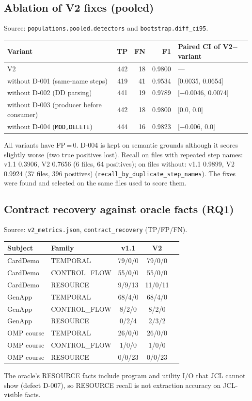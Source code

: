 \subsection{Ablation of V2 fixes (pooled)}
Source: \texttt{populations.pooled.detectors} and \texttt{bootstrap.diff\_ci95}.
\begin{center}
\small
\begin{tabular}{@{}lrrrl@{}}
\toprule
Variant & TP & FN & F1 & Paired CI of V2$-$variant \\
\midrule
V2 & 442 & 18 & 0.9800 & --- \\
without D-001 (same-name steps) & 419 & 41 & 0.9534 & [0.0035, 0.0654] \\
without D-002 (DD parsing) & 441 & 19 & 0.9789 & [$-$0.0046, 0.0074] \\
without D-003 (producer before consumer) & 442 & 18 & 0.9800 & [0.0, 0.0] \\
without D-004 (\texttt{MOD,DELETE}) & 444 & 16 & 0.9823 & [$-$0.006, 0.0] \\
\bottomrule
\end{tabular}
\end{center}
All variants have FP\,=\,0. D-004 is kept on semantic grounds although it scores
slightly worse (two true positives lost). Recall on files with repeated step
names: v1.1 0.3906, V2 0.7656 (6 files, 64 positives); on files without:
v1.1 0.9899, V2 0.9924 (37 files, 396 positives)
(\texttt{recall\_by\_duplicate\_step\_names}). The fixes were found and
selected on the same files used to score them.

\subsection{Contract recovery against oracle facts (RQ1)}
Source: \texttt{v2\_metrics.json}, \texttt{contract\_recovery} (TP/FP/FN).
\begin{center}
\small
\begin{tabular}{@{}llccc@{}}
\toprule
Subject & Family & v1.1 & V2 & \\
\midrule
CardDemo & TEMPORAL & 79/0/0 & 79/0/0 & \\
CardDemo & CONTROL\_FLOW & 55/0/0 & 55/0/0 & \\
CardDemo & RESOURCE & 9/9/13 & 11/0/11 & \\
GenApp & TEMPORAL & 68/4/0 & 68/4/0 & \\
GenApp & CONTROL\_FLOW & 8/2/0 & 8/2/0 & \\
GenApp & RESOURCE & 0/2/4 & 2/3/2 & \\
OMP course & TEMPORAL & 26/0/0 & 26/0/0 & \\
OMP course & CONTROL\_FLOW & 1/0/0 & 1/0/0 & \\
OMP course & RESOURCE & 0/0/23 & 0/0/23 & \\
\bottomrule
\end{tabular}
\end{center}
The oracle's RESOURCE facts include program and utility I/O that JCL cannot show
(defect D-007), so RESOURCE recall is not extraction accuracy on JCL-visible facts.

